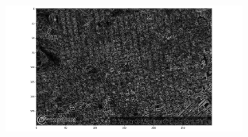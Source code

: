 \documentclass[
  letterpaper,
  DIV=11,
  numbers=noendperiod]{scrreprt}
\begin{document}
\begin{figure}

\begin{minipage}{0.33\linewidth}

\begin{figure}[H]

{\centering \includegraphics{images/plots/aerial_cities/sf_mag.png}

}


\end{figure}%

\end{minipage}%
%
\begin{minipage}{0.33\linewidth}

\begin{figure}[H]


\end{figure}
\end{minipage}
\end{figure}
\end{document}
